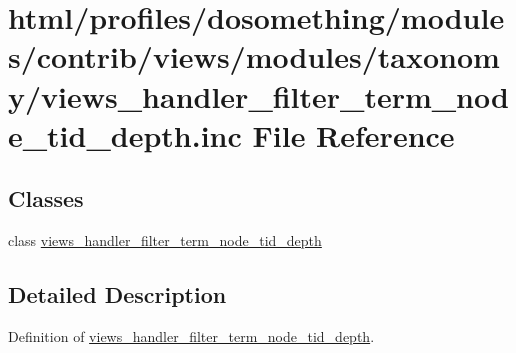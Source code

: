 \hypertarget{views__handler__filter__term__node__tid__depth_8inc}{
\section{html/profiles/dosomething/modules/contrib/views/modules/taxonomy/views\_\-handler\_\-filter\_\-term\_\-node\_\-tid\_\-depth.inc File Reference}
\label{views__handler__filter__term__node__tid__depth_8inc}
}
\subsection*{Classes}
\begin{DoxyCompactItemize}
\item 
class \hyperlink{classviews__handler__filter__term__node__tid__depth}{views\_\-handler\_\-filter\_\-term\_\-node\_\-tid\_\-depth}
\end{DoxyCompactItemize}


\subsection{Detailed Description}
Definition of \hyperlink{classviews__handler__filter__term__node__tid__depth}{views\_\-handler\_\-filter\_\-term\_\-node\_\-tid\_\-depth}. 